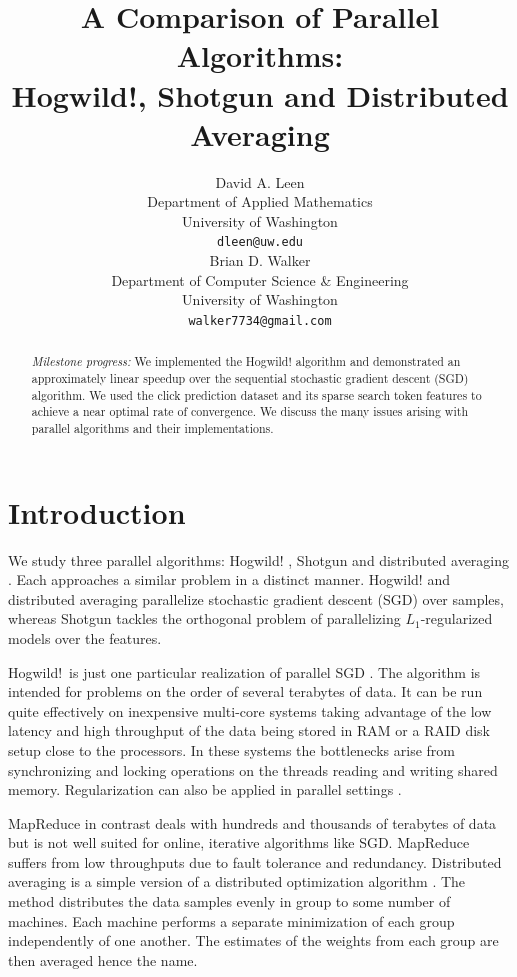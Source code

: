 \documentclass{article} %
\title{A Comparison of Parallel Algorithms:\\ {\Large Hogwild!, Shotgun and Distributed Averaging}}
\author{
David A. Leen \\
Department of Applied Mathematics\\
University of Washington \\
\texttt{dleen@uw.edu} \\
\And
Brian D. Walker \\
Department of Computer Science \& Engineering \\
University of Washington \\
\texttt{walker7734@gmail.com} \\
}
\begin{document}
\maketitle

\begin{abstract}
{\em Milestone progress:} We implemented the Hogwild! algorithm and demonstrated an approximately linear speedup over the
sequential stochastic gradient descent (SGD) algorithm.  We used the click prediction dataset and its sparse search token features to achieve a near optimal rate of convergence. We discuss the many issues arising with parallel algorithms and their implementations.
\end{abstract}

\section{Introduction}
We study three parallel algorithms: Hogwild! \cite{niu2011hogwild}, Shotgun \cite{bradley2011parallel} and distributed averaging \cite{zhang2012comunication}. Each approaches a similar problem in a distinct manner. Hogwild! and distributed averaging parallelize stochastic gradient descent (SGD) over samples, whereas Shotgun tackles the orthogonal problem of parallelizing $L_1$-regularized models over the features.

Hogwild!~is just one particular realization of parallel SGD \cite{niu2011hogwild, zinkevich2010parallelized}. The algorithm is intended for problems on the order of several terabytes of data. It can be run quite effectively on inexpensive multi-core systems taking advantage of the low latency and high throughput of the data being stored in RAM or a RAID disk setup close to the processors. In these systems the bottlenecks arise from synchronizing and locking operations on the threads reading and writing shared memory. Regularization can also be applied in parallel settings \cite{langford2009slow, agarwal2011distributed}.

MapReduce in contrast deals with hundreds and thousands of terabytes of data but is not well suited for online, iterative algorithms like SGD. MapReduce suffers from low throughputs due to fault tolerance and redundancy. Distributed averaging is a simple version of a distributed optimization algorithm \cite{dekel2012optimal, agarwal2011distributed}. The method distributes the data samples evenly in group to some number of machines. Each machine performs a separate minimization of each group independently of one another. The estimates of the weights from each group are then averaged hence the name.
\end{document}
